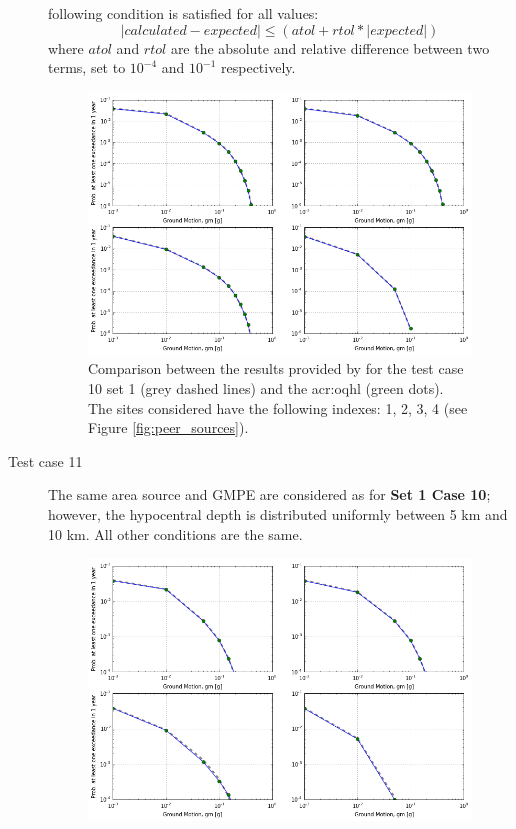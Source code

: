 \begin{description}
        following condition is satisfied for all values:
        \begin{equation}
        |calculated - expected| \leq \left( {atol + rtol * |expected|} \right)
        \end{equation}
        where $atol$ and $rtol$ are the absolute and relative difference 
        between two terms, set to $10^{-4}$ and $10^{-1}$ respectively.
\begin{figure}[!ht]
\centering
\includegraphics[width=14cm]{./Pictures/qa/test10_set1.png}
\caption{Comparison between the results provided by \textcite{thomas2010}
for the test case 10 set 1 (grey dashed lines) and the \gls{acr:oqhl} 
(green dots). The sites considered have the following indexes: 
1, 2, 3, 4 (see Figure \ref{fig:peer_sources}).}
\label{fig:peer_set1_test10}
\end{figure}
    \clearpage
    \item [Test case 11]
        The same area source and GMPE are considered as for 
        \textbf{Set 1 Case 10}; 
        however, the hypocentral depth is distributed uniformly between 5 km 
        and 10 km. All other conditions are the same.
\begin{figure}[!ht]
\centering
\includegraphics[width=14cm]{./Pictures/qa/test11_set1.png}

\end{figure}
\end{description}
